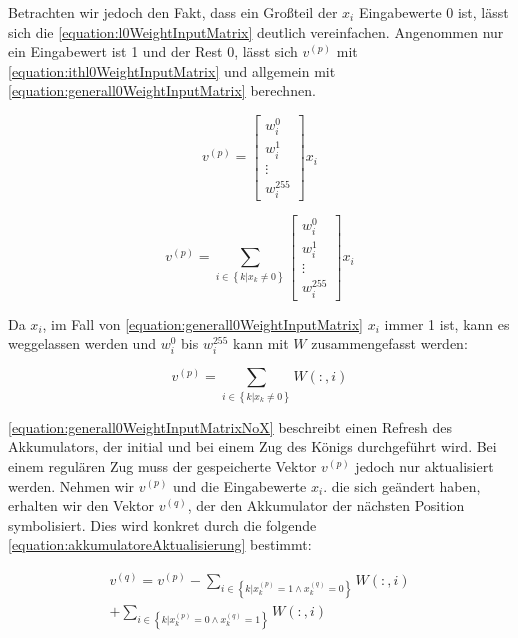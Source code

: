 Betrachten wir jedoch den Fakt, dass ein Großteil der $x_{i}$ Eingabewerte 0 ist, lässt sich die \autoref{equation:l0WeightInputMatrix} deutlich vereinfachen. Angenommen nur ein Eingabewert ist 1 und der Rest 0, lässt sich $v^{(p)}$ mit \autoref{equation:ithl0WeightInputMatrix} und allgemein mit \autoref{equation:generall0WeightInputMatrix} berechnen.

\begin{equation}
  v^{(p)}=\begin{bmatrix}
    w_{i}^{0} \\
    w_{i}^{1} \\
    \vdots    \\
    w_{i}^{255}
  \end{bmatrix} x_{i}
  \label{equation:ithl0WeightInputMatrix}
\end{equation}

\begin{equation}
  v^{(p)}= \sum_{i\in\left \{  k|x_{k}\neq 0\right \}} \begin{bmatrix}
    w_{i}^{0} \\
    w_{i}^{1} \\
    \vdots    \\
    w_{i}^{255}
  \end{bmatrix} x_{i}
  \label{equation:generall0WeightInputMatrix}
\end{equation}

Da $x_{i}$, im Fall von \autoref{equation:generall0WeightInputMatrix} $x_{i}$ immer 1 ist, kann es weggelassen werden und $w_{i}^{0}$ bis $w_{i}^{255}$ kann mit $W$ zusammengefasst werden:

\begin{equation}
  v^{(p)}= \sum_{i\in\left \{  k|x_{k}\neq 0\right \}} W(:,i)
  \label{equation:generall0WeightInputMatrixNoX}
\end{equation}

\autoref{equation:generall0WeightInputMatrixNoX} beschreibt einen Refresh des Akkumulators, der initial und bei einem Zug des Königs durchgeführt wird. Bei einem regulären Zug muss der gespeicherte Vektor $v^{(p)}$ jedoch nur aktualisiert werden. Nehmen wir $v^{(p)}$ und die Eingabewerte $x_{i}$. die sich geändert haben, erhalten wir den Vektor $v^{(q)}$, der den Akkumulator der nächsten Position symbolisiert. Dies wird konkret durch die folgende \autoref{equation:akkumulatoreAktualisierung} bestimmt:

\begin{equation}
  \begin{split}
    v^{(q)} = v^{(p)}
    - \sum_{i \in \left \{ k | x_{k}^{(p)}=1\wedge x_{k}^{(q)}=0 \right \}}^{} W(:,i) \\
    + \sum_{i \in \left \{ k | x_{k}^{(p)}=0\wedge x_{k}^{(q)}=1 \right \}}^{} W(:,i)
  \end{split}
  \label{equation:akkumulatoreAktualisierung}
\end{equation}

